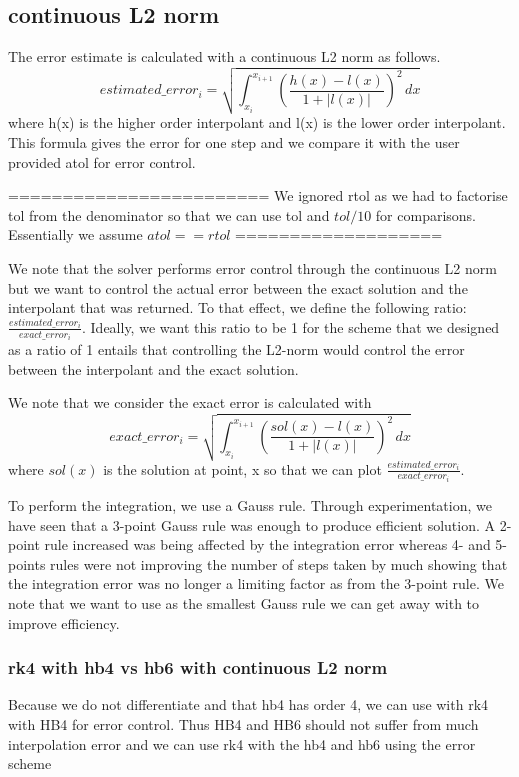 \subsection{continuous L2 norm}
The error estimate is calculated with a continuous L2 norm as follows.
\begin{equation}
estimated\_error_i = \sqrt{ \int_{x_i}^{x_{i+1}} (\frac{h(x) - l(x)}{1 + |l(x)|})^2 \,dx }
\end{equation}
where h(x) is the higher order interpolant and l(x) is the lower order interpolant. This formula gives the error for one step and we compare it with the user provided atol for error control. 

========================
We ignored rtol as we had to factorise tol from the denominator so that we can use tol and $tol/10$ for comparisons. Essentially we assume $atol == rtol$
===================

We note that the solver performs error control through the continuous L2 norm but we want to control the actual error between the exact solution and the interpolant that was returned. To that effect, we define the following ratio: $\frac{estimated\_error_i}{exact\_error_i}$. Ideally, we want this ratio to be 1 for the scheme that we designed as a ratio of 1 entails that controlling the L2-norm would control the error between the interpolant and the exact solution.

We note that we consider the exact error is calculated with
\begin{equation}
exact\_error_i = \sqrt{ \int_{x_i}^{x_{i+1}} (\frac{sol(x) - l(x)}{1 + |l(x)|})^2 \,dx }
\end{equation}
where $sol(x)$ is the solution at point, x so that we can plot $\frac{estimated\_error_i}{exact\_error_i}$. 

To perform the integration, we use a Gauss rule. Through experimentation, we have seen that a 3-point Gauss rule was enough to produce efficient solution. A 2-point rule increased was being affected by the integration error whereas 4- and 5-points rules were not improving the number of steps taken by much showing that the integration error was no longer a limiting factor as from the 3-point rule. We note that we want to use as the smallest Gauss rule we can get away with to improve efficiency.

\subsubsection{rk4 with hb4 vs hb6 with continuous L2 norm}
Because we do not differentiate and that hb4 has order 4, we can use with rk4 with HB4 for error control. Thus HB4 and HB6 should not suffer from much interpolation error and we can use rk4 with the hb4 and hb6 using the error scheme


